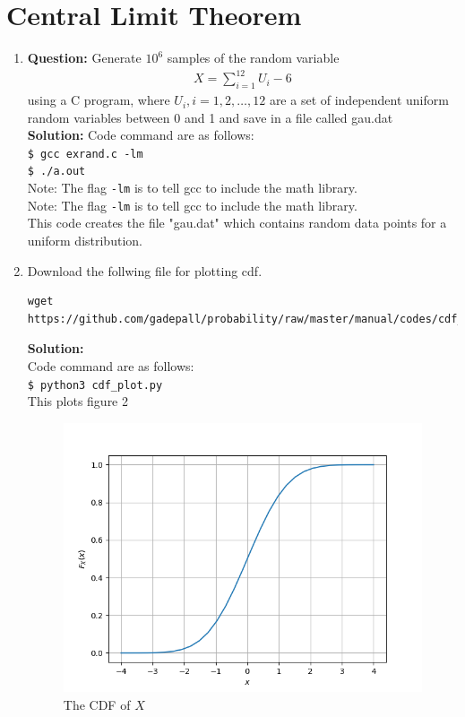 \documentclass[journal,12pt,twocolumn]{IEEEtran}
\begin{document}
\section{Central Limit Theorem}
\begin{enumerate}[label=\thesection.\arabic*
,ref=\thesection.\theenumi]
        \item\textbf{Question:} Generate $10^6$ samples of the random variable\\
%
\begin{align}
X = \sum_{i=1}^{12}U_i -6
\end{align}
%
using a C program, where $U_i, i = 1,2,\dots, 12$ are  a set of independent uniform random variables between 0 and 1
and save in a file called gau.dat\\

\noindent \textbf{Solution:}
Code command are as follows:\\
\texttt{\$ gcc exrand.c -lm}\\
\texttt{\$ ./a.out}\\
Note: The flag \texttt{-lm} is to tell gcc to include the math library.\\
Note: The flag \texttt{-lm} is to tell gcc to include the math library.\\ 
This code creates the file "gau.dat" which contains random data points for a uniform distribution.




\item Download the follwing file for plotting cdf.
\begin{lstlisting}
wget https://github.com/gadepall/probability/raw/master/manual/codes/cdf_plot.py
\end{lstlisting}
\textbf{Solution:}\\
Code command are as follows:\\
\texttt{\$ python3 cdf\_plot.py}\\
This plots figure 2\\
\begin{figure}[!ht]
\centering
\includegraphics[width=\columnwidth]{./figs/Figure_2.png}
    \caption{The CDF of $X$}
\label{fig:gauss_X}
\end{figure}\\




\end{enumerate}
\end{document}
